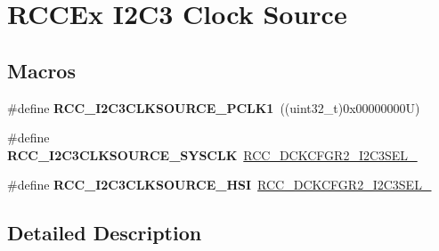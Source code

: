 \hypertarget{group___r_c_c_ex___i2_c3___clock___source}{}\section{R\+C\+C\+Ex I2\+C3 Clock Source}
\label{group___r_c_c_ex___i2_c3___clock___source}
\subsection*{Macros}
\begin{DoxyCompactItemize}
\item 
\mbox{\label{group___r_c_c_ex___i2_c3___clock___source_ga32cf2e3b0c2d7988833577547ba5ad76}} 
\#define {\bfseries R\+C\+C\+\_\+\+I2\+C3\+C\+L\+K\+S\+O\+U\+R\+C\+E\+\_\+\+P\+C\+L\+K1}~((uint32\+\_\+t)0x00000000\+U)
\item 
\mbox{\label{group___r_c_c_ex___i2_c3___clock___source_ga3d4bde7e23e661154eee079f3ef57c09}} 
\#define {\bfseries R\+C\+C\+\_\+\+I2\+C3\+C\+L\+K\+S\+O\+U\+R\+C\+E\+\_\+\+S\+Y\+S\+C\+LK}~\mbox{\hyperlink{group___peripheral___registers___bits___definition_ga912a2daeca1cfceb763c47dfc50ef59c}{R\+C\+C\+\_\+\+D\+C\+K\+C\+F\+G\+R2\+\_\+\+I2\+C3\+S\+E\+L\+\_}}
\item 
\mbox{\label{group___r_c_c_ex___i2_c3___clock___source_ga15d4072c90a04b2393e49f05dc3c8fd2}} 
\#define {\bfseries R\+C\+C\+\_\+\+I2\+C3\+C\+L\+K\+S\+O\+U\+R\+C\+E\+\_\+\+H\+SI}~\mbox{\hyperlink{group___peripheral___registers___bits___definition_gadd360ba20bbfe973cd1df73641ecaf50}{R\+C\+C\+\_\+\+D\+C\+K\+C\+F\+G\+R2\+\_\+\+I2\+C3\+S\+E\+L\+\_}}
\end{DoxyCompactItemize}


\subsection{Detailed Description}
